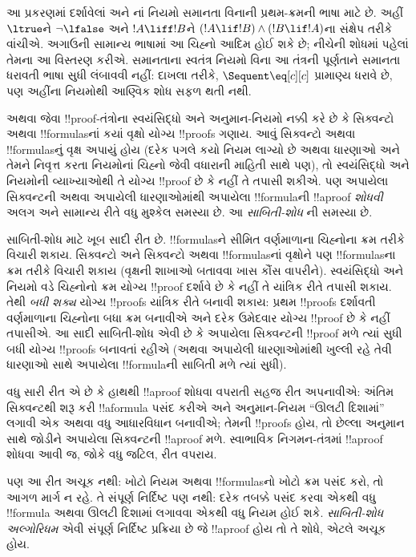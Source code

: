 \documentclass[../../../include/open-logic-section]{subfiles}
\begin{document}


\begin{explain}
આ પ્રકરણમાં દર્શાવેલાં  અને નાં નિયમો
સમાનતા વિનાની પ્રથમ-ક્રમની ભાષા માટે છે. અહીં
$\ltrue$ને $\lnot\lfalse$ અને $!A\liff !B$ને
$(!A\lif !B)\land(!B\lif !A)$ના સંક્ષેપ તરીકે વાંચીએ.
અગાઉની સામાન્ય ભાષામાં આ ચિહ્નો આદિમ હોઈ શકે છે;
નીચેની શોધમાં પહેલાં તેમના આ વિસ્તરણ કરીએ.
સમાનતાના સ્વતંત્ર નિયમો વિના આ તંત્રની પૂર્ણતાને
સમાનતા ધરાવતી ભાષા સુધી લંબાવવી નહીં: દાખલા તરીકે,
$\Sequent \eq[c][c]$ પ્રામાણ્ય ધરાવે છે, પણ અહીંના
નિયમોથી આણ્વિક શોધ સફળ થતી નથી.
\end{explain}

 અથવા
 જેવા
!!{proof}-તંત્રોના
સ્વયંસિદ્ધો અને
અનુમાન-નિયમો
નક્કી કરે છે
કે સિક્વન્ટો
અથવા !!{formula}sનાં
કયાં વૃક્ષો
યોગ્ય !!{proof}s
ગણાય. આવું
સિક્વન્ટો અથવા
!!{formula}sનું
વૃક્ષ અપાયું
હોય (દરેક
પગલે કયો નિયમ
લાગ્યો છે
અથવા ધારણાઓ
અને તેમને
નિવૃત્ત કરતા
નિયમોનાં
ચિહ્નો જેવી
વધારાની માહિતી
સાથે પણ),
તો સ્વયંસિદ્ધો
અને નિયમોની
વ્યાખ્યાઓથી
તે યોગ્ય
!!{proof} છે
કે નહીં તે
તપાસી શકીએ.
પણ અપાયેલા
સિક્વન્ટની
અથવા અપાયેલી
ધારણાઓમાંથી
અપાયેલા
!!{formula}ની
!!a{proof}
\emph{શોધવી}
અલગ અને
સામાન્ય રીતે
વધુ મુશ્કેલ
સમસ્યા છે.
આ \emph{સાબિતી-શોધ}
ની સમસ્યા છે.

સાબિતી-શોધ માટે
ખૂબ સાદી
રીત છે.
!!{formula}sને
સીમિત વર્ણમાળાના
ચિહ્નોના ક્રમ
તરીકે વિચારી
શકાય. સિક્વન્ટો
અને સિક્વન્ટો
અથવા
!!{formula}sનાં
વૃક્ષોને પણ
!!{formula}sના
ક્રમ તરીકે
વિચારી શકાય
(વૃક્ષની શાખાઓ
બતાવવા ખાસ
કૌંસ વાપરીને).
સ્વયંસિદ્ધો
અને નિયમો
વડે ચિહ્નોનો
ક્રમ યોગ્ય
!!{proof}
દર્શાવે છે
કે નહીં તે
યાંત્રિક રીતે
તપાસી શકાય.
તેથી \emph{બધી
શક્ય} યોગ્ય
!!{proof}s
યાંત્રિક રીતે
બનાવી શકાય:
પ્રથમ !!{proof}s
દર્શાવતી
વર્ણમાળાના
ચિહ્નોના બધા
ક્રમ બનાવીએ
અને દરેક
ઉમેદવાર યોગ્ય
!!{proof} છે
કે નહીં તપાસીએ.
આ સાદી
સાબિતી-શોધ
એવી છે કે
અપાયેલા સિક્વન્ટની
!!{proof} મળે
ત્યાં સુધી
બધી યોગ્ય
!!{proof}s
બનાવતાં રહીએ
(અથવા અપાયેલી
ધારણાઓમાંથી
ખુલ્લી રહે
તેવી ધારણાઓ
સાથે અપાયેલા
!!{formula}ની
સાબિતી મળે
ત્યાં સુધી).

વધુ સારી
રીત એ છે
કે હાથથી
!!a{proof}
શોધવા વપરાતી
સહજ રીત
અપનાવીએ:
અંતિમ સિક્વન્ટથી
શરૂ કરી
!!a{formula}
પસંદ કરીએ
અને અનુમાન-નિયમ
``ઊલટી દિશામાં''
લગાવી એક
અથવા વધુ
આધારવિધાન
બનાવીએ; તેમની
!!{proof}s
હોય, તો
છેલ્લા અનુમાન
સાથે જોડીને
અપાયેલા સિક્વન્ટની
!!a{proof}
મળે. સ્વાભાવિક
નિગમન-તંત્રમાં
!!a{proof}
શોધવા આવી
જ, જોકે
વધુ જટિલ,
રીત વપરાય.

પણ આ રીત
અચૂક નથી:
ખોટો નિયમ
અથવા
!!{formula}sનો
ખોટો ક્રમ
પસંદ કરો,
તો આગળ
માર્ગ ન
રહે. તે
સંપૂર્ણ નિર્દિષ્ટ
પણ નથી:
દરેક તબક્કે
પસંદ કરવા
એકથી વધુ
!!{formula}
અથવા ઊલટી
દિશામાં
લગાવવા એકથી
વધુ નિયમ
હોઈ શકે.
\emph{સાબિતી-શોધ
અલ્ગોરિધમ}
એવી સંપૂર્ણ
નિર્દિષ્ટ
પ્રક્રિયા છે
જે !!a{proof}
હોય તો
તે શોધે,
એટલે અચૂક
હોય.
\end{document}
